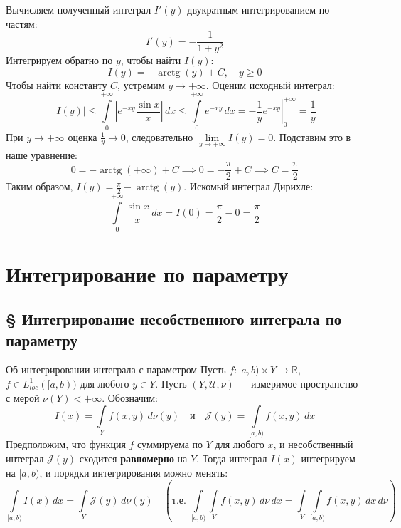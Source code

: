 \documentclass[12pt,a4paper]{article}
\begin{document}
Вычисляем полученный интеграл $I'(y)$ двукратным интегрированием по частям:
$$ I'(y) = -\frac{1}{1+y^2} $$
Интегрируем обратно по $y$, чтобы найти $I(y)$:
$$ I(y) = -\operatorname{arctg}(y) + C, \quad y \ge 0 $$
Чтобы найти константу $C$, устремим $y \to +\infty$. Оценим исходный интеграл:
$$ |I(y)| \le \int\limits_0^{+\infty} \left| e^{-xy} \frac{\sin x}{x} \right| \, dx \le \int\limits_0^{+\infty} e^{-xy} \, dx = \left. -\frac{1}{y} e^{-xy} \right|_0^{+\infty} = \frac{1}{y} $$
При $y \to +\infty$ оценка $\frac{1}{y} \to 0$, следовательно $\lim\limits_{y \to +\infty} I(y) = 0$.
Подставим это в наше уравнение:
$$ 0 = -\operatorname{arctg}(+\infty) + C \implies 0 = -\frac{\pi}{2} + C \implies C = \frac{\pi}{2} $$
Таким образом, $I(y) = \frac{\pi}{2} - \operatorname{arctg}(y)$.
Искомый интеграл Дирихле:
$$ \int\limits_0^{+\infty} \frac{\sin x}{x} \, dx = I(0) = \frac{\pi}{2} - 0 = \frac{\pi}{2} $$

\section{Интегрирование по параметру}
\subsection{§ Интегрирование несобственного интеграла по параметру}

\begin{Theorem}{Об интегрировании интеграла с параметром}{}
Пусть $f: [a, b) \times Y \to \mathbb{R}$, $f \in L^1_{loc}([a,b))$ для любого $y \in Y$. Пусть $(Y, \mathcal{U}, \nu)$ — измеримое пространство с мерой $\nu(Y) < +\infty$.
Обозначим:
$$ I(x) = \int\limits_Y f(x,y) \, d\nu(y) \quad \text{и} \quad \mathcal{J}(y) = \int\limits_{[a,b)} f(x,y) \, dx $$
Предположим, что функция $f$ суммируема по $Y$ для любого $x$, и несобственный интеграл $\mathcal{J}(y)$ сходится \textbf{равномерно} на $Y$. Тогда интеграл $I(x)$ интегрируем на $[a,b)$, и порядки интегрирования можно менять:
$$ \int\limits_{[a,b)} I(x) \, dx = \int\limits_Y \mathcal{J}(y) \, d\nu(y) \quad \left( \text{т.е. } \int\limits_{[a,b)} \int\limits_Y f(x,y) \, d\nu \, dx = \int\limits_Y \int\limits_{[a,b)} f(x,y) \, dx \, d\nu \right) $$
\end{Theorem}
\end{document}
